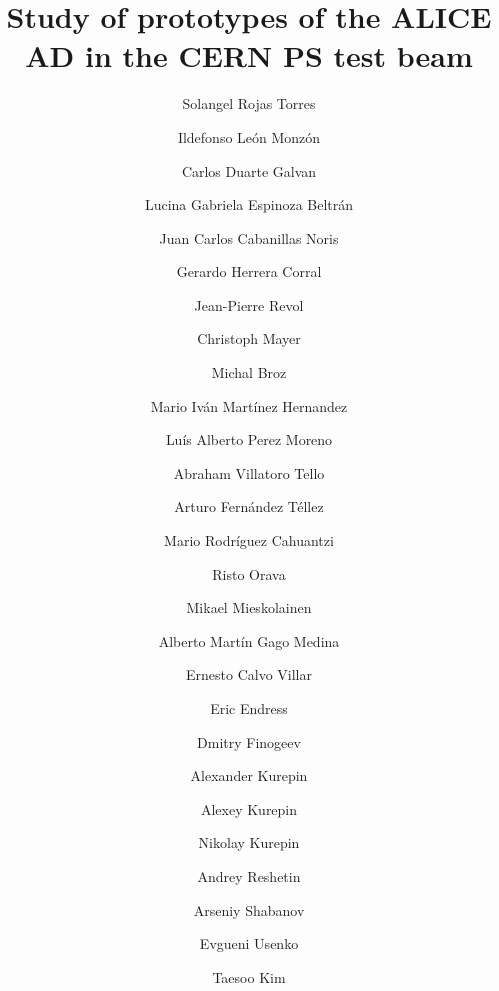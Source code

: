 \documentclass[review]{elsarticle}
\begin{document}
\linenumbers

\begin{frontmatter}

\title{Study of prototypes of the ALICE AD in the CERN PS test beam}



\author[uas]{Solangel Rojas Torres}
\author[uas]{Ildefonso Le\'on Monz\'on}
\author[uas]{Carlos Duarte Galvan}
\author[uas]{Lucina Gabriela Espinoza Beltr\'an}
\author[uas]{Juan Carlos Cabanillas Noris}
\author[civestav]{Gerardo Herrera Corral}
\author[csr]{Jean-Pierre Revol}
\author[thn]{Christoph Mayer}
\author[ctu]{Michal Broz}
\author[buap]{Mario Iv\'an Mart\'inez Hernandez}
\author[buap]{Lu\'is Alberto Perez Moreno}
\author[buap]{Abraham Villatoro Tello}
\author[buap]{Arturo Fern\'andez T\'ellez}
\author[buap]{Mario Rodr\'iguez Cahuantzi}
\author[Helsinki0,Helsinki1]{Risto Orava}
\author[Helsinki0]{Mikael Mieskolainen}
\author[pucp]{Alberto Mart\'in Gago Medina}
\author[pucp]{Ernesto Calvo Villar}
\author[pucp]{Eric Endress}
\author[Helsinki0]{Dmitry Finogeev}
\author[inr]{Alexander Kurepin}
\author[inr]{Alexey Kurepin}
\author[inr]{Nikolay Kurepin}
\author[inr]{Andrey Reshetin}
\author[inr]{Arseniy Shabanov}
\author[inr]{Evgueni Usenko}
\author[seul]{Taesoo Kim}

\address[uas]{\textit{Universidad Aut\'onoma de Sinaloa},CULIACAN, M\'exico}
\address[buap]{\textit{Benem\'erita Univ. Aut\'onoma de Puebla},PUEBLA, M\'exico}
\address[civestav]{\textit{Centro de Investigación y de Estudios Avanzados del IPN}, C.D. M\'EXICO, M\'exico}
\address[csr]{Centro Studi e Ricerche ``Enrico Fermi'', ROMA, Italy}
\address[thn]{\textit{The Henryk Niewodniczanski Inst. of Nucl. Physics Polish Academy of Sciences}, CRACOW, Poland}
\address[seul]{\textit{Yonsei University}, SEOUL, South Korea}
\address[ctu]{\textit{Czech Technical University of Prague}, PRAHA, Czech Republic}
\address[Helsinki0]{\textit{Helsinki Inst. of Physics}, HELSINKI, Finland} 
\address[Helsinki1]{\textit{The University of Helsinki}, HELSINKI, Finland} 
\address[pucp]{\textit{Pontificia Universidad Cat\'olica del Per\'u}, LIMA, Per\'u}
\address[inr]{\textit{Russian Academy of Sciences, Inst. for Nuclear Research}, MOSCOW, Russia}


\end{frontmatter}
\end{document}
